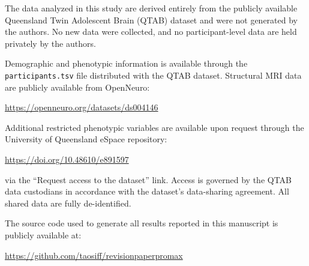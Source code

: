 \documentclass[10pt,letterpaper]{article}
\begin{document}
The data analyzed in this study are derived entirely from the publicly available Queensland Twin Adolescent Brain (QTAB) dataset and were not generated by the authors. No new data were collected, and no participant-level data are held privately by the authors.

Demographic and phenotypic information is available through the \texttt{participants.tsv} file distributed with the QTAB dataset. Structural MRI data are publicly available from OpenNeuro:

\begin{center}
\url{https://openneuro.org/datasets/ds004146}
\end{center}

Additional restricted phenotypic variables are available upon request through the University of Queensland eSpace repository:

\begin{center}
\url{https://doi.org/10.48610/e891597}
\end{center}

via the ``Request access to the dataset'' link. Access is governed by the QTAB data custodians in accordance with the dataset's data-sharing agreement. All shared data are fully de-identified.

The source code used to generate all results reported in this manuscript is publicly available at:

\begin{center}
\url{https://github.com/taosiff/revisionpaperpromax}
\end{center}
\end{document}
